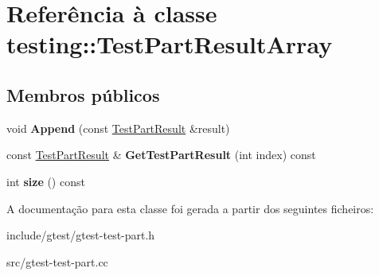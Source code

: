 \hypertarget{classtesting_1_1TestPartResultArray}{\section{Referência à classe testing\-:\-:Test\-Part\-Result\-Array}
\label{classtesting_1_1TestPartResultArray}
}
\subsection*{Membros públicos}
\begin{DoxyCompactItemize}
\item 
\hypertarget{classtesting_1_1TestPartResultArray_a01844bd505b18a666324617a1b459558}{void {\bfseries Append} (const \hyperlink{classtesting_1_1TestPartResult}{Test\-Part\-Result} \&result)}\label{classtesting_1_1TestPartResultArray_a01844bd505b18a666324617a1b459558}

\item 
\hypertarget{classtesting_1_1TestPartResultArray_a799a09c9ad8c1c8875400af78efe4b17}{const \hyperlink{classtesting_1_1TestPartResult}{Test\-Part\-Result} \& {\bfseries Get\-Test\-Part\-Result} (int index) const }\label{classtesting_1_1TestPartResultArray_a799a09c9ad8c1c8875400af78efe4b17}

\item 
\hypertarget{classtesting_1_1TestPartResultArray_acd805ad4edda06d983456b2a30760dce}{int {\bfseries size} () const }\label{classtesting_1_1TestPartResultArray_acd805ad4edda06d983456b2a30760dce}

\end{DoxyCompactItemize}


A documentação para esta classe foi gerada a partir dos seguintes ficheiros\-:\begin{DoxyCompactItemize}
\item 
include/gtest/gtest-\/test-\/part.\-h\item 
src/gtest-\/test-\/part.\-cc\end{DoxyCompactItemize}
